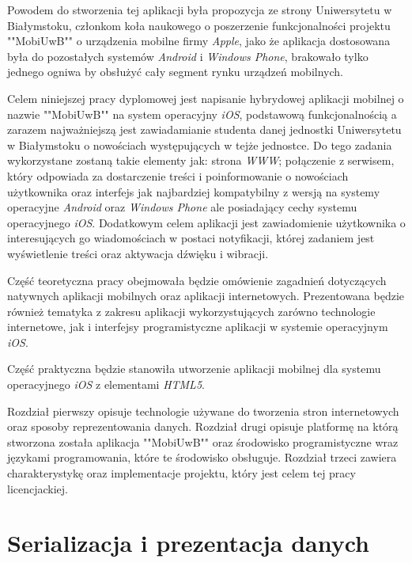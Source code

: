\documentclass{iiuwb}
\begin{document}
Powodem do stworzenia tej aplikacji była propozycja ze strony Uniwersytetu w Białymstoku, członkom koła naukowego o poszerzenie funkcjonalności projektu ""MobiUwB"" o urządzenia mobilne firmy \textit{Apple}, jako że aplikacja dostosowana była do pozostałych systemów \textit{Android} i \textit{Windows Phone}, brakowało tylko jednego ogniwa by obsłużyć cały segment rynku urządzeń mobilnych.

Celem niniejszej pracy dyplomowej jest napisanie hybrydowej aplikacji mobilnej o nazwie ""MobiUwB"" na system operacyjny \textit{iOS}, podstawową funkcjonalnością a zarazem najważniejszą jest zawiadamianie studenta danej jednostki Uniwersytetu w Białymstoku o nowościach występujących w tejże jednostce. Do tego zadania wykorzystane zostaną takie elementy jak: strona \textit{WWW}; połączenie z serwisem, który odpowiada za dostarczenie treści i poinformowanie o nowościach użytkownika oraz interfejs jak najbardziej kompatybilny z wersją na systemy operacyjne \textit{Android} oraz \textit{Windows Phone} ale posiadający cechy systemu operacyjnego \textit{iOS}. Dodatkowym celem aplikacji jest zawiadomienie użytkownika o interesujących go wiadomościach w postaci notyfikacji, której zadaniem jest wyświetlenie treści oraz aktywacja dźwięku i wibracji.

Część teoretyczna pracy obejmowała będzie omówienie zagadnień dotyczących natywnych aplikacji mobilnych oraz aplikacji internetowych. Prezentowana będzie również tematyka z zakresu aplikacji wykorzystujących zarówno technologie internetowe, jak i interfejsy programistyczne aplikacji w systemie operacyjnym \textit{iOS}.

Część praktyczna będzie stanowiła utworzenie aplikacji mobilnej dla systemu operacyjnego \textit{iOS} z elementami \textit{HTML5}.

Rozdział pierwszy opisuje technologie używane do tworzenia stron internetowych oraz sposoby reprezentowania danych. Rozdział drugi opisuje platformę na którą stworzona została aplikacja ""MobiUwB"" oraz środowisko programistyczne wraz językami programowania, które te środowisko obsługuje. Rozdział trzeci zawiera charakterystykę oraz implementacje projektu, który jest celem tej pracy licencjackiej.                                                                
\cleardoublepage
\chapter{Serializacja i prezentacja danych}
\label{cha:Serializacja i prezentacja danych}
\end{document}
